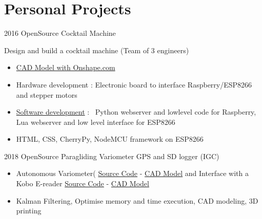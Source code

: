 \documentclass[a4paper]{friggeri-cv} %
\begin{document}

\section{Personal Projects}

\begin{entrylist}

\entry
{2016}
{ OpenSource Cocktail Machine }
{  }
{ Design and build a cocktail machine (Team of 3 engineers)
\begin{itemize}
\item \href{https://cad.onshape.com/documents/fb6038b2912b9dee202ae483/w/fca3360b8bc95b6a2f76da72/e/469430195367acaf31facc33}{CAD Model with Onshape.com}
\item { Hardware development : Electronic board to interface Raspberry/ESP8266 and stepper motors }
\item {\href{https://github.com/tilaktilak/Inebriator}{Software development} : \
Python webserver and lowlevel code for Raspberry, Lua webserver and low level interface for ESP8266}
\item {HTML, CSS, CherryPy, NodeMCU framework on ESP8266}
\end{itemize}
}

\entry
{2018}
{ OpenSource Paragliding Variometer GPS and SD logger (IGC) }
{  }
{
\begin{itemize}
\item Autonomous Variometer( \href{https://github.com/tilaktilak/variometre}{Source Code} - \href{https://cad.onshape.com/documents/a2edef2565390c2a63887be6/w/e115fc79a19f6ea7701f931d/e/4bf08f905543160a6d4a78ce}{CAD Model} 
and Interface with a Kobo E-reader \href{https://github.com/tilaktilak/xcvario}{Source Code} - \href{https://cad.onshape.com/documents/e35f287762e7eb2639163738/w/944245d017b66dfac14ea554/e/e65c9aaedd3effabe6219e48}{CAD Model}
\item Kalman Filtering, Optimise memory and time execution, CAD modeling, 3D printing
\end{itemize} 

}
\end{entrylist}
\end{document}
